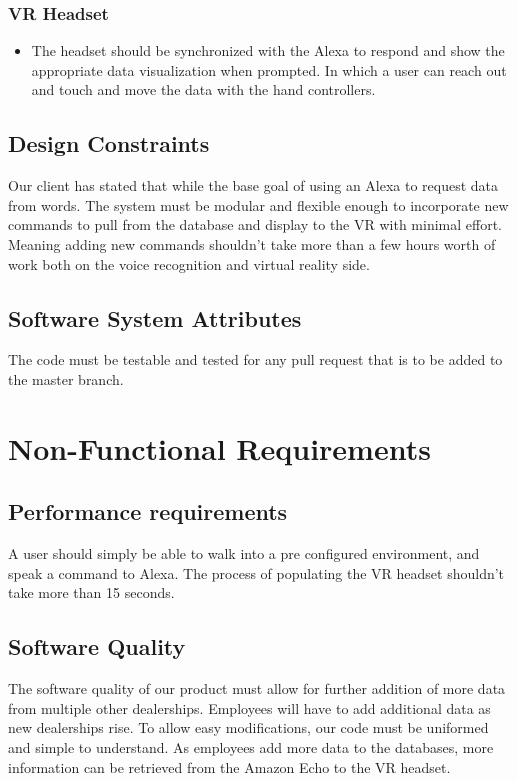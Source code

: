 \documentclass[onecolumn, draftclsnofoot,10pt, compsoc]{IEEEtran}
\begin{document}
        \subsubsection{VR Headset}
            \begin{itemize}
                    \item The headset should be synchronized with the Alexa to respond and show the appropriate data visualization when prompted. In which a user can reach out and touch and move the data with the hand controllers.
            \end{itemize}

    \subsection{Design Constraints}
        Our client has stated that while the base goal of using an Alexa to request data from words. The system must be modular and flexible enough to incorporate new commands to pull from the database and display to the VR with minimal effort. Meaning adding new commands shouldn’t take more than a few hours worth of work both on the voice recognition and virtual reality side.


    \subsection{Software System Attributes}
        The code must be testable and tested for any pull request that is to be added to the master branch.


\section{Non-Functional Requirements}

\subsection{Performance requirements}
    A user should simply be able to walk into a pre configured environment, and speak a command to Alexa. The process of populating the VR headset shouldn't take more than 15 seconds.
\subsection{Software Quality}
   The software quality of our product must allow for further addition of more data from multiple other dealerships. Employees will have to add additional data as new dealerships rise. To allow easy modifications, our code must be uniformed and simple to understand. As employees add more data to the databases, more information can be retrieved from the Amazon Echo to the VR headset.
\end{document}
